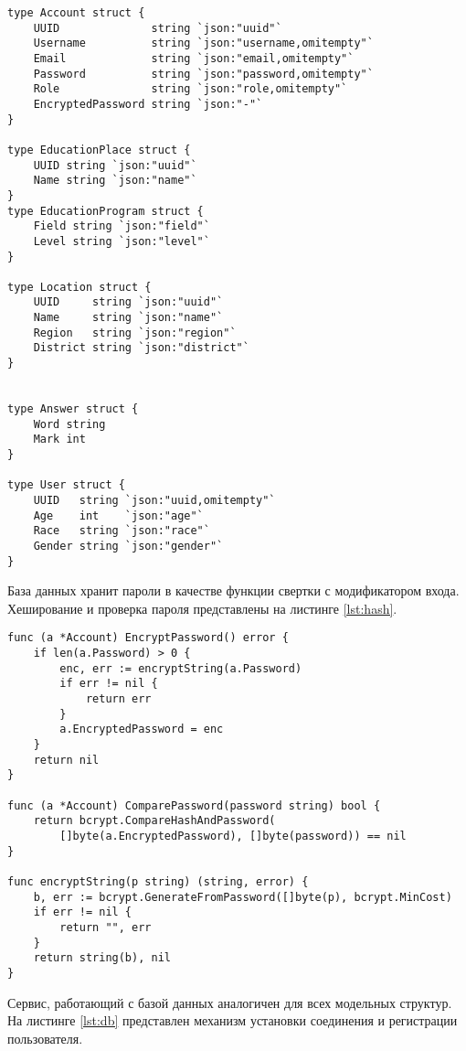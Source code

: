 \begin{lstlisting}[label=lst:model,caption=Модельные структуры]
type Account struct {
	UUID              string `json:"uuid"`
	Username          string `json:"username,omitempty"`
	Email             string `json:"email,omitempty"`
	Password          string `json:"password,omitempty"`
	Role              string `json:"role,omitempty"`
	EncryptedPassword string `json:"-"`
}

type EducationPlace struct {
	UUID string `json:"uuid"`
	Name string `json:"name"`
}
type EducationProgram struct {
	Field string `json:"field"`
	Level string `json:"level"`
}

type Location struct {
	UUID     string `json:"uuid"`
	Name     string `json:"name"`
	Region   string `json:"region"`
	District string `json:"district"`
}


type Answer struct {
	Word string
	Mark int
}

type User struct {
	UUID   string `json:"uuid,omitempty"`
	Age    int    `json:"age"`
	Race   string `json:"race"`
	Gender string `json:"gender"`
}
\end{lstlisting}
База данных хранит пароли в качестве функции свертки с модификатором входа. Хеширование и проверка пароля представлены на листинге \ref{lst:hash}.
\begin{lstlisting}[label=lst:hash,caption=Хеширование и проверка пароля]
func (a *Account) EncryptPassword() error {
	if len(a.Password) > 0 {
		enc, err := encryptString(a.Password)
		if err != nil {
			return err
		}
		a.EncryptedPassword = enc
	}
	return nil
}

func (a *Account) ComparePassword(password string) bool {
	return bcrypt.CompareHashAndPassword(
		[]byte(a.EncryptedPassword), []byte(password)) == nil
}

func encryptString(p string) (string, error) {
	b, err := bcrypt.GenerateFromPassword([]byte(p), bcrypt.MinCost)
	if err != nil {
		return "", err
	}
	return string(b), nil
}
\end{lstlisting}

Сервис, работающий с базой данных аналогичен для всех модельных структур. На листинге \ref{lst:db} представлен механизм установки соединения и регистрации пользователя.

